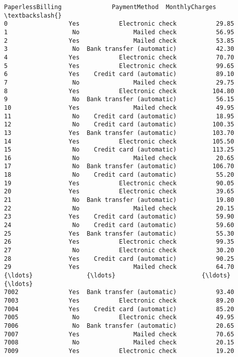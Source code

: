 \documentclass[11pt]{article}
\begin{document}
\begin{tcolorbox}[breakable, boxrule=.5pt, size=fbox, pad at break*=1mm, opacityfill=0]
\begin{Verbatim}[commandchars=\\\{\}]
     PaperlessBilling              PaymentMethod  MonthlyCharges  \textbackslash{}
0                 Yes           Electronic check           29.85
1                  No               Mailed check           56.95
2                 Yes               Mailed check           53.85
3                  No  Bank transfer (automatic)           42.30
4                 Yes           Electronic check           70.70
5                 Yes           Electronic check           99.65
6                 Yes    Credit card (automatic)           89.10
7                  No               Mailed check           29.75
8                 Yes           Electronic check          104.80
9                  No  Bank transfer (automatic)           56.15
10                Yes               Mailed check           49.95
11                 No    Credit card (automatic)           18.95
12                 No    Credit card (automatic)          100.35
13                Yes  Bank transfer (automatic)          103.70
14                Yes           Electronic check          105.50
15                 No    Credit card (automatic)          113.25
16                 No               Mailed check           20.65
17                 No  Bank transfer (automatic)          106.70
18                 No    Credit card (automatic)           55.20
19                Yes           Electronic check           90.05
20                Yes           Electronic check           39.65
21                 No  Bank transfer (automatic)           19.80
22                 No               Mailed check           20.15
23                Yes    Credit card (automatic)           59.90
24                 No    Credit card (automatic)           59.60
25                Yes  Bank transfer (automatic)           55.30
26                Yes           Electronic check           99.35
27                 No           Electronic check           30.20
28                Yes    Credit card (automatic)           90.25
29                Yes               Mailed check           64.70
{\ldots}               {\ldots}                        {\ldots}             {\ldots}
7002              Yes  Bank transfer (automatic)           93.40
7003              Yes           Electronic check           89.20
7004              Yes    Credit card (automatic)           85.20
7005               No           Electronic check           49.95
7006               No  Bank transfer (automatic)           20.65
7007              Yes               Mailed check           70.65
7008               No               Mailed check           20.15
7009              Yes           Electronic check           19.20

\end{Verbatim}
\end{tcolorbox}
\end{document}

